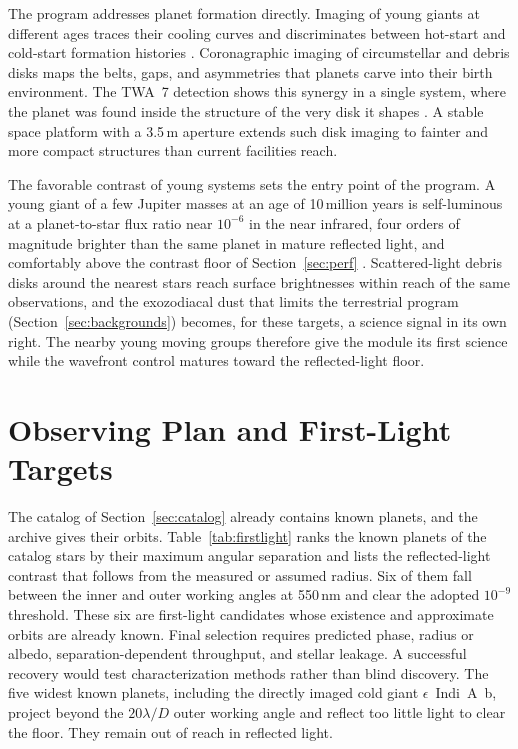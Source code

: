 The program addresses planet formation directly. Imaging of young
giants at different ages traces their cooling curves and
discriminates between hot-start and cold-start formation histories
\cite{zurlo24}. Coronagraphic imaging of circumstellar and debris
disks maps the belts, gaps, and asymmetries that planets carve into
their birth environment. The TWA~7 detection shows this synergy in a
single system, where the planet was found inside the structure of the
very disk it shapes \cite{lagrange25}. A stable space platform with a
3.5\,m aperture extends such disk imaging to fainter and more compact
structures than current facilities reach.

The favorable contrast of young systems sets the entry point of the
program. A young giant of a few Jupiter masses at an age of 10\,million
years is self-luminous at a planet-to-star flux ratio near $10^{-6}$ in
the near infrared, four orders of magnitude brighter than the same planet
in mature reflected light, and comfortably above the contrast floor of
Section~\ref{sec:perf} \cite{zurlo24}. Scattered-light debris disks around
the nearest stars reach surface brightnesses within reach of the same
observations, and the exozodiacal dust that limits the terrestrial program
(Section~\ref{sec:backgrounds}) becomes, for these targets, a science
signal in its own right. The nearby young moving groups therefore give the
module its first science while the wavefront control matures toward the
reflected-light floor.

\section{Observing Plan and First-Light Targets}
\label{sec:ops}

The catalog of Section~\ref{sec:catalog} already contains known planets,
and the archive gives their orbits. Table~\ref{tab:firstlight} ranks the
known planets of the catalog stars by their maximum angular separation and
lists the reflected-light contrast that follows from the measured or
assumed radius. Six of them fall between the inner and outer working
angles at 550\,nm and clear the adopted $10^{-9}$ threshold. These six are
first-light candidates whose existence and approximate orbits are already
known. Final selection requires predicted phase, radius or albedo,
separation-dependent throughput, and stellar leakage. A successful
recovery would test characterization methods rather than blind discovery.
The five widest known planets, including the directly
imaged cold giant $\epsilon$~Indi~A~b, project beyond the $20\lambda/D$
outer working angle and reflect too little light to clear the floor. They
remain out of reach in reflected light.

